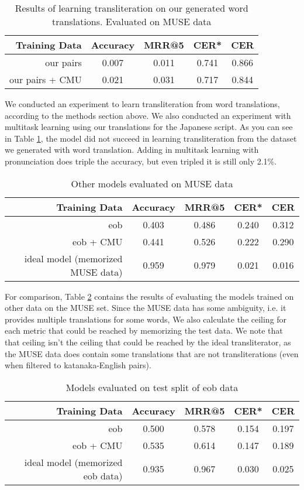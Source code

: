 \documentclass{article}
\begin{document}
\begin{table}[h]
  \centering
  \begin{tabular}{r | c c c c}
    Training Data & Accuracy & MRR@5 & CER* & CER \\
    \hline
    our pairs & 0.007 & 0.011 & 0.741 & 0.866 \\
    our pairs + CMU & 0.021 & 0.031 & 0.717 & 0.844 \\
  \end{tabular}
  \caption{Results of learning transliteration on our generated word
    translations. Evaluated on MUSE data}
  \label{tab:our-muse}
\end{table}

We conducted an experiment to learn transliteration from word translations,
according to the methods section above.
We also conducted an experiment with multitask learning
using our translations for the Japanese script.
As you can see in Table \ref{tab:our-muse},
the model did not succeed in learning transliteration
from the dataset we generated with word translation.
Adding in multitask learning with pronunciation does triple the accuracy,
but even tripled it is still only 2.1\%.

\begin{table}[h]
  \centering
  \begin{tabular}{r | c c c c}
    Training Data & Accuracy & MRR@5 & CER* & CER \\
    \hline
    eob & 0.403 & 0.486 & 0.240 & 0.312 \\
    eob + CMU & 0.441 & 0.526 & 0.222 & 0.290 \\
    \hline
    ideal model (memorized MUSE data) & 0.959 & 0.979 & 0.021 & 0.016\\
  \end{tabular}
  \caption{Other models evaluated on MUSE data}
  \label{tab:other-muse}
\end{table}

For comparison,
Table \ref{tab:other-muse} contains the results of evaluating
the models trained on other data on the MUSE set.
Since the MUSE data has some ambiguity,
i.e. it provides multiple translations for some words,
We also calculate the ceiling for each metric
that could be reached by memorizing the test data.
We note that that ceiling isn't
the ceiling that could be reached by the ideal transliterator,
as the MUSE data does contain some translations that are not transliterations
(even when filtered to katanaka-English pairs).

\begin{table}[h]
  \centering
  \begin{tabular}{r | c c c c}
    Training Data & Accuracy & MRR@5 & CER* & CER \\
    \hline
    eob & 0.500 & 0.578 & 0.154 & 0.197 \\
    eob + CMU & 0.535 & 0.614 & 0.147 & 0.189 \\
    \hline
    ideal model (memorized eob data) & 0.935 & 0.967 & 0.030 & 0.025 \\
  \end{tabular}
  \caption{Models evaluated on test split of eob data}
  \label{tab:eob-results}
\end{table}
\end{document}
